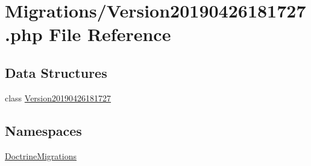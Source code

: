 \hypertarget{_version20190426181727_8php}{}\section{Migrations/\+Version20190426181727.php File Reference}
\label{_version20190426181727_8php}
\subsection*{Data Structures}
\begin{DoxyCompactItemize}
\item 
class \mbox{\hyperlink{class_doctrine_migrations_1_1_version20190426181727}{Version20190426181727}}
\end{DoxyCompactItemize}
\subsection*{Namespaces}
\begin{DoxyCompactItemize}
\item 
 \mbox{\hyperlink{namespace_doctrine_migrations}{Doctrine\+Migrations}}
\end{DoxyCompactItemize}
